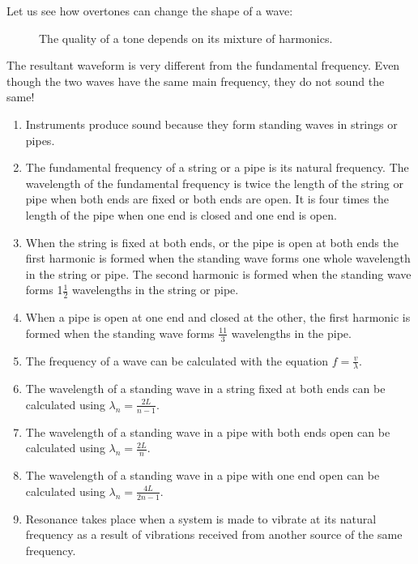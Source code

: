 Let us see how overtones can change the shape of a wave:

\begin{figure}[H]
\begin{center}
\end {center}
\caption{The quality of a tone depends on its mixture of
harmonics.}
\label{sound:wave}
\end{figure}

The resultant waveform is very different from the fundamental
frequency.  Even though the two waves have the same main
frequency, they do not sound the same!

\begin{enumerate}
\item Instruments produce sound because they form standing waves in strings or pipes.
\item The fundamental frequency of a string or a pipe is its natural frequency. The wavelength
of the fundamental frequency is twice the length of the string or pipe when both ends are fixed or both ends are open. It is four times the length of the pipe when one end is closed and one end is open.
\item When the string is fixed at both ends, or the pipe is open at both ends the first harmonic is formed when the standing wave forms one whole
wavelength in the string or pipe. The second harmonic is formed when the
standing wave forms 1$\frac{1}{2}$ wavelengths in the string or pipe.
\item When a pipe is open at one end and closed at the other, the first harmonic is formed when the standing wave forms $\frac{11}{3}$ wavelengths in the pipe.
\item The frequency of a wave can be calculated with the equation $f = \frac{v}{\lambda}$.
\item The wavelength of a standing wave in a string fixed at both ends can be calculated using
$\lambda_{n} = \frac{2L}{n-1}$.
\item The wavelength of a standing wave in a pipe with both ends open can be calculated using
$\lambda_{n} = \frac{2L}{n}$.
\item The wavelength of a standing wave in a pipe with one end open can be calculated using
$\lambda_{n} = \frac{4L}{2n-1}$.
\item Resonance takes place when a system is made to vibrate at its natural frequency as a
result of vibrations received from another source of the same frequency.
\end{enumerate}

